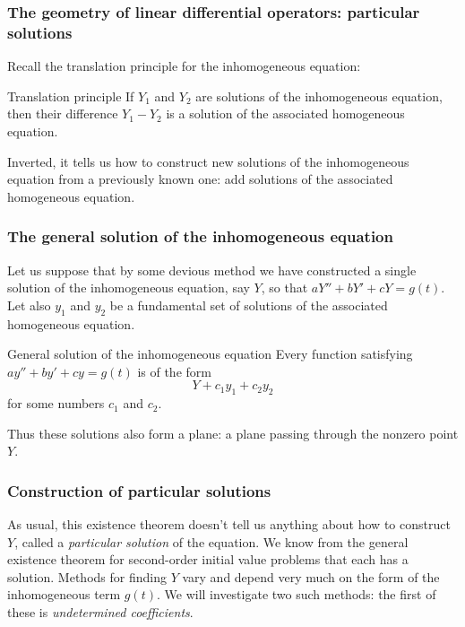 \begin{frame}

\frametitle{The geometry of linear differential operators: particular solutions}
\label{thegeometryoflineardifferentialoperators:particularsolutions}

Recall the translation principle for the inhomogeneous equation:

\begin{block}{Translation principle}
If $Y_1$ and $Y_2$ are solutions of the inhomogeneous equation, then their difference $Y_1 - Y_2$ is a solution of the associated homogeneous equation.
\end{block}

Inverted, it tells us how to construct new solutions of the inhomogeneous equation from a previously known one: add solutions of the associated homogeneous equation.

\end{frame}

\begin{frame}

\frametitle{The general solution of the inhomogeneous equation}
\label{thegeneralsolutionoftheinhomogeneousequation}

Let us suppose that by some devious method we have constructed a single solution of the inhomogeneous equation, say $ Y $, so that $ aY'' + bY' + cY = g(t) $. Let also $ y_1 $ and $ y_2 $ be a fundamental set of solutions of the associated homogeneous equation.

\begin{block}{General solution of the inhomogeneous equation}
Every function satisfying $ay'' + by' + cy = g(t)$ is of the form
\[ Y + c_1y_1 + c_2 y_2 \]
for some numbers $c_1$ and $c_2$.
\end{block}

Thus these solutions also form a plane: a plane passing through the nonzero point $ Y $.

\end{frame}

\begin{frame}

\frametitle{Construction of particular solutions}
\label{constructionofparticularsolutions}

As usual, this existence theorem doesn't tell us anything about how to construct $ Y $, called a \emph{particular solution} of the equation. We know from the general existence theorem for second-order initial value problems that each has a solution. Methods for finding $ Y $ vary and depend very much on the form of the inhomogeneous term $ g(t) $. We will investigate two such methods: the first of these is \emph{undetermined coefficients}.

\end{frame}

